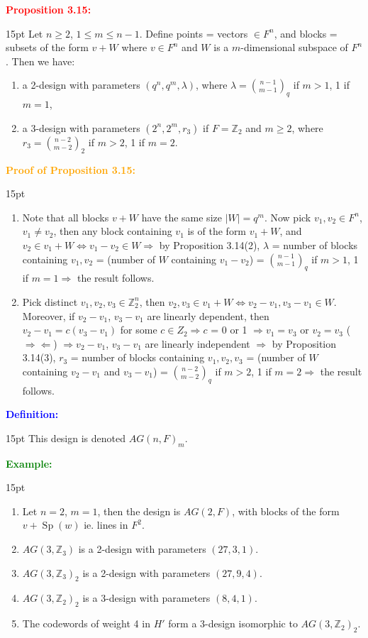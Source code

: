 \documentclass[12pt]{article}
\newcommand{\noparskip}{\vspace{-\parskip}}
\newenvironment{points}
	{\begin{enumerate}[label = (\arabic*)]}
	{\end{enumerate}}
\newenvironment{dent}
	{\begin{adjustwidth}{15pt}{}\noparskip}
	{\end{adjustwidth}}
\newenvironment{result}[1]
	{\textcolor{Red}{\textbf{#1:}}\begin{dent}}
	{\end{dent}}
\newenvironment{proof}[1]
	{\textcolor{Orange}{\textbf{Proof of #1:}}\begin{dent}}
	{\end{dent}}
\newenvironment{definition}
	{\textcolor{Blue}{\textbf{Definition:}}\begin{dent}}
	{\end{dent}}
\newenvironment{example}
	{\textcolor{Green}{\textbf{Example:}}\begin{dent}}
	{\end{dent}}
\renewcommand{\implies}{\Rightarrow}
\renewcommand{\iff}{\Leftrightarrow}
\newcommand{\contradiction}{\Rightarrow \Leftarrow}
\newcommand{\sizeof}[1]{\left| #1 \right|}
\newcommand{\Z}{\mathbb{Z}}
\renewcommand{\span}[1]{\operatorname{Sp}(#1)}
\begin{document}
\begin{result}{Proposition 3.15}
Let $n \ge 2$, $1 \le m \le n - 1$. Define points = vectors $\in F^n$, and blocks = subsets of the form $v + W$ where $v \in F^n$ and $W$ is a $m$-dimensional subspace of $F^n$. Then we have:
\noparskip
\begin{points}
\item a 2-design with parameters $(q^n, q^m, \lambda)$, where $\lambda = \binom{n - 1}{m - 1}_q$ if $m > 1$, 1 if $m = 1$,
\item a 3-design with parameters $(2^n, 2^m, r_3)$ if $F = \Z_2$ and $m \ge 2$, where $r_3 = \binom{n - 2}{m - 2}_2$ if $m > 2$, 1 if $m = 2$.
\end{points}
\end{result}

\begin{proof}{Proposition 3.15}
\begin{points}
\item Note that all blocks $v + W$ have the same size $\sizeof{W} = q^m$. Now pick $v_1, v_2 \in F^n$, $v_1 \ne v_2$, then any block containing $v_1$ is of the form $v_1 + W$, and $v_2 \in v_1 + W \iff v_1 - v_2 \in W \implies$ by Proposition 3.14(2), $\lambda$ = number of blocks containing $v_1, v_2$ = (number of $W$ containing $v_1 - v_2$) = $\binom{n - 1}{m - 1}_q$ if $m > 1$, 1 if $m = 1 \implies$ the result follows.
\item Pick distinct $v_1, v_2, v_3 \in \Z_2^n$, then $v_2, v_3 \in v_1 + W \iff v_2 - v_1, v_3 - v_1 \in W$. Moreover, if $v_2 - v_1$, $v_3 - v_1$ are linearly dependent, then $v_2 - v_1 = c(v_3 - v_1)$ for some $c \in Z_2 \implies c$ = 0 or 1 $\implies v_1 = v_3$ or $v_2 = v_3$ ($\contradiction$) $\implies v_2 - v_1$, $v_3 - v_1$ are linearly independent $\implies$ by Proposition 3.14(3), $r_3$ = number of blocks containing $v_1, v_2, v_3$ = (number of $W$ containing $v_2 - v_1$ and $v_3 - v_1$) = $\binom{n - 2}{m - 2}_q$ if $m > 2$, 1 if $m = 2 \implies$ the result follows.
\end{points}
\end{proof}

\begin{definition}
This design is denoted $AG(n, F)_m$.
\end{definition}

\begin{example}
\begin{points}
\item Let $n = 2$, $m = 1$, then the design is $AG(2, F)$, with blocks of the form $v + \span{w}$ ie. lines in $F^2$.
\item $AG(3, \Z_3)$ is a 2-design with parameters $(27, 3, 1)$.
\item $AG(3, \Z_3)_2$ is a 2-design with parameters $(27, 9, 4)$.
\item $AG(3, \Z_2)_2$ is a 3-design with parameters $(8, 4, 1)$.
\item The codewords of weight 4 in $H'$ form a 3-design isomorphic to $AG(3, \Z_2)_2$.
\end{points}
\end{example}
\end{document}
